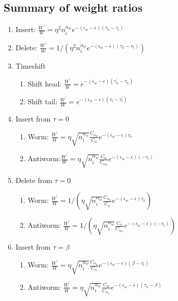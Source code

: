 \documentclass[12pt, two sided]{article}
\begin{document}
	\subsection{Summary of weight ratios}	
    \begin{enumerate}
        \setcounter{enumi}{0}
    \item Insert:  $\frac{W^\prime}{W}= \eta^2 n_i^{\alpha_w} e^{-(\epsilon_w-\epsilon)(\tau_h-\tau_t)}$
    
    \item Delete: $\frac{W^\prime}{W}= 1/(\eta^2 n_i^{\alpha_w} e^{-(\epsilon_w-\epsilon)(\tau_h-\tau_t)})$
    
    \item Timeshift
    	\begin{enumerate}
	\item{Shift head: $\frac{W^\prime}{W}=e^{-(\epsilon_w-\epsilon)(\tau_h^\prime-\tau_h)}$}
	\item{Shift tail: $\frac{W^\prime}{W}=e^{-(\epsilon_w-\epsilon)(\tau_t-\tau_t^\prime)}$}
	\end{enumerate}
	
    \item Insert from $\tau=0$
    	\begin{enumerate}
	\item{Worm: $\frac{W^\prime}{W}= \eta \sqrt{n_i^{\alpha_w}} \frac{C_{\alpha_w}}{C_{\alpha}}e^{-(\epsilon_w-\epsilon)\tau_h}$ }
	\item{Antiworm:$\frac{W^\prime}{W}= \eta \sqrt{n_i^{\alpha_w}} \frac{C_{\alpha}}{C_{\alpha_w}}e^{-(\epsilon_w-\epsilon)(-\tau_t)}$ }
	\end{enumerate}
	
    \item Delete from $\tau=0$
    	\begin{enumerate}
	\item{Worm: $\frac{W^\prime}{W}= 1/(\eta \sqrt{n_i^{\alpha_w}} \frac{C_{\alpha_w}}{C_{\alpha}}e^{-(\epsilon_w-\epsilon)\tau_h})$}
	\item{Antiworm: $\frac{W^\prime}{W}= 1/(\eta \sqrt{n_i^{\alpha_w}} \frac{C_{\alpha}}{C_{\alpha_w}}e^{-(\epsilon_w-\epsilon)(-\tau_t)}) $}
	\end{enumerate}
	
    \item Insert from $\tau=\beta$
    	\begin{enumerate}
	\item{Worm: $\frac{W^\prime}{W}= \eta \sqrt{n_i^{\alpha_w}} \frac{C_{\alpha_w}}{C_{\alpha}}e^{-(\epsilon_w-\epsilon)(\beta-\tau_t)}$}
	\item{Antiworm: $\frac{W^\prime}{W}= \eta \sqrt{n_i^{\alpha_w}} \frac{C_{\alpha}}{C_{\alpha_w}}e^{-(\epsilon_w-\epsilon)(\tau_h - \beta)}$}
	\end{enumerate}
	

\end{enumerate}
\end{document}
